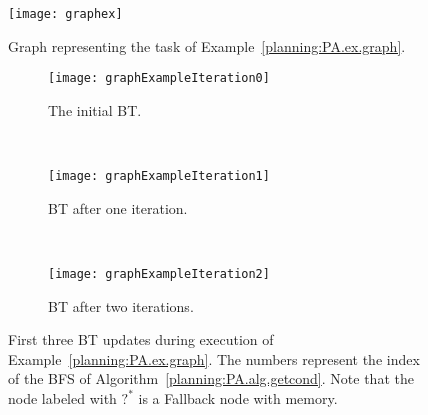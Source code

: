 \begin{figure}[h]

                \centering
                \texttt{[image: graphex]}
        \caption{Graph representing the task of Example~\ref{planning:PA.ex.graph}.}
        \label{planning:PA.fig.graph}
\end{figure}

\begin{figure}[h]
                \centering

        \begin{subfigure}[b]{0.2\columnwidth}
                \centering
                \texttt{[image: graphExampleIteration0]}
                \caption{The initial BT. }
                \label{planning:PA.fig.graphit0}              
        \end{subfigure}          
  ~       
                   \centering

        \begin{subfigure}[b]{0.6\columnwidth}
                \centering
                \texttt{[image: graphExampleIteration1]}
                \caption{BT after one iteration.}
                \label{planning:PA.fig.graphit1}              
        \end{subfigure}
 ~         %
        \begin{subfigure}[b]{0.6\columnwidth}
                \centering
                \texttt{[image: graphExampleIteration2]}
                \caption{BT after two iterations.}
                \label{planning:PA.fig.graphit2}
        \end{subfigure}  
        \caption{First three BT updates during execution of Example~\ref{planning:PA.ex.graph}. The numbers represent the index of the BFS of Algorithm~\ref{planning:PA.alg.getcond}. {Note that the node labeled with $?^*$ is a Fallback node with memory.}}
     
  \end{figure}


